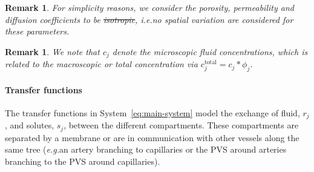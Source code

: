 \documentclass[10pt]{article}
\newcommand{\ie}{\emph{i.e.}\;}
\newcommand{\eg}{\emph{e.g.}\;}
\newcommand{\1}{^{(1)}}
\newcommand{\2}{^{(2)}}
\newtheorem{remark}[theorem]{Remark}
\newcommand{\corr}[1]{\textcolor{blue}{#1}} %
\providecommand{\DIFaddtex}[1]{{\protect\color{blue}\uwave{#1}}} %
\providecommand{\DIFdeltex}[1]{{\protect\color{red}\sout{#1}}}                      %
\providecommand{\DIFaddbegin}{} %
\providecommand{\DIFaddend}{} %
\providecommand{\DIFdelbegin}{} %
\providecommand{\DIFdelend}{} %
\providecommand{\DIFadd}[1]{\texorpdfstring{\DIFaddtex{#1}}{#1}} %
\providecommand{\DIFdel}[1]{\texorpdfstring{\DIFdeltex{#1}}{}} %
\newcommand{\DIFscaledelfig}{0.5}
\newlength{\DIFdelgraphicswidth} %
\newlength{\DIFdelgraphicsheight} %
\newcommand{\DIFaddincludegraphics}[2][]{{\color{blue}\fbox{\DIFOincludegraphics[#1]{#2}}}} %
\newcommand{\DIFdelincludegraphics}[2][]{%
\sbox{\DIFdelgraphicsbox}{\DIFOincludegraphics[#1]{#2}}%
\settoboxwidth{\DIFdelgraphicswidth}{\DIFdelgraphicsbox} %
\settoboxtotalheight{\DIFdelgraphicsheight}{\DIFdelgraphicsbox} %
\scalebox{\DIFscaledelfig}{%
\parbox[b]{\DIFdelgraphicswidth}{\usebox{\DIFdelgraphicsbox}\\[-\baselineskip] \rule{\DIFdelgraphicswidth}{0em}}\llap{\resizebox{\DIFdelgraphicswidth}{\DIFdelgraphicsheight}{%
\setlength{\unitlength}{\DIFdelgraphicswidth}%
\begin{picture}(1,1)%
\thicklines\linethickness{2pt} %
{\color[rgb]{1,0,0}\put(0,0){\framebox(1,1){}}}%
{\color[rgb]{1,0,0}\put(0,0){\line( 1,1){1}}}%
{\color[rgb]{1,0,0}\put(0,1){\line(1,-1){1}}}%
\end{picture}%
}\hspace*{3pt}}} %
} %
\DeclareRobustCommand{\DIFaddbegin}{\DIFOaddbegin \let\includegraphics\DIFaddincludegraphics} %
\DeclareRobustCommand{\DIFaddend}{\DIFOaddend \let\includegraphics\DIFOincludegraphics} %
\DeclareRobustCommand{\DIFdelbegin}{\DIFOdelbegin \let\includegraphics\DIFdelincludegraphics} %
\DeclareRobustCommand{\DIFdelend}{\DIFOaddend \let\includegraphics\DIFOincludegraphics} %
\begin{document}
\begin{remark}
    For simplicity reasons, we consider the porosity, permeability and diffusion coefficients to be \DIFdelbegin \DIFdel{isotropic}\DIFdelend \DIFaddbegin \DIFadd{\corr{homogeneous}}\DIFaddend , \ie no spatial variation are considered for these parameters. 
\end{remark}

\begin{remark}
    We note that $c_j$ denote the microscopic fluid concentrations, which is related to the macroscopic or total concentration via $c_j^\text{total} = c_j*\phi_j$.
\end{remark}

\paragraph{Transfer functions}
The transfer functions in System~\eqref{eq:main-system} model the exchange of fluid, $r_j$, and solutes, $s_j$, between the different compartments. 
These compartments are separated by a membrane or are in communication with other vessels along the same tree (\eg an artery branching to capillaries or the PVS around arteries branching to the PVS around capillaries).
\end{document}
